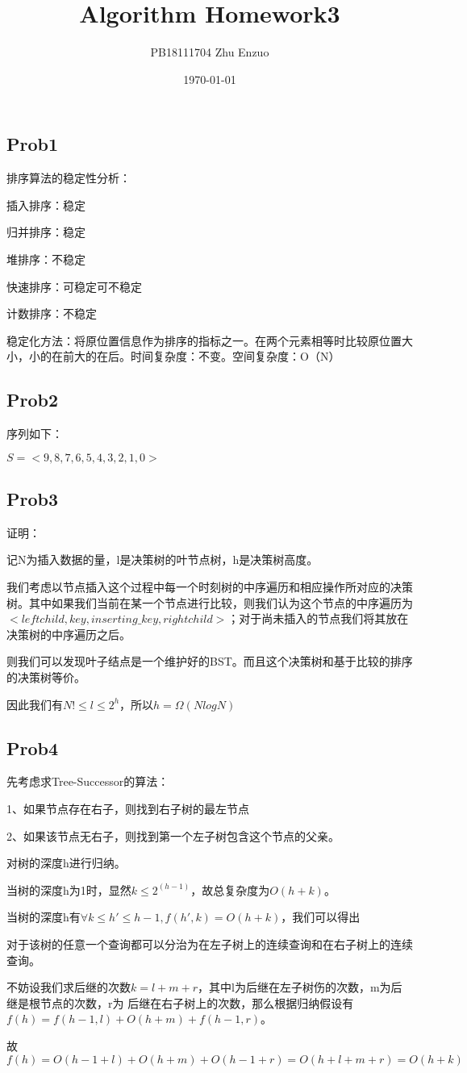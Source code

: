 \documentclass{ctexart}
\title{Algorithm Homework3}
\author{PB18111704 Zhu Enzuo}
\date{\today}
\begin{document}
\maketitle

\subsection{Prob1} 排序算法的稳定性分析：

插入排序：稳定

归并排序：稳定

堆排序：不稳定

快速排序：可稳定可不稳定

计数排序：不稳定

稳定化方法：将原位置信息作为排序的指标之一。在两个元素相等时比较原位置大小，小的在前大的在后。时间复杂度：不变。空间复杂度：O（N）

\subsection{Prob2} 序列如下：

$S=<9,8,7,6,5,4,3,2,1,0>$

\subsection{Prob3} 证明：

记N为插入数据的量，l是决策树的叶节点树，h是决策树高度。

我们考虑以节点插入这个过程中每一个时刻树的中序遍历和相应操作所对应的决策树。其中如果我们当前在某一个节点进行比较，则我们认为这个节点的中序遍历为$<leftchild, key, inserting\_key, rightchild>$；对于尚未插入的节点我们将其放在决策树的中序遍历之后。

则我们可以发现叶子结点是一个维护好的BST。而且这个决策树和基于比较的排序的决策树等价。

因此我们有$N! \le l \le 2^h$，所以$h=\Omega(NlogN)$

\subsection{Prob4}先考虑求Tree-Successor的算法：

1、如果节点存在右子，则找到右子树的最左节点

2、如果该节点无右子，则找到第一个左子树包含这个节点的父亲。

对树的深度h进行归纳。

当树的深度h为1时，显然$k \le 2^(h-1)$，故总复杂度为$O(h+k)$。

当树的深度h有$\forall k\le h'\le h-1, f(h',k)=O(h+k)$，我们可以得出

对于该树的任意一个查询都可以分治为在左子树上的连续查询和在右子树上的连续查询。

不妨设我们求后继的次数$k=l+m+r$，其中l为后继在左子树伤的次数，m为后继是根节点的次数，r为
后继在右子树上的次数，那么根据归纳假设有$f(h)=f(h-1,l)+O(h+m)+f(h-1,r)$。

故$f(h)=O(h-1+l)+O(h+m)+O(h-1+r)=O(h+l+m+r)=O(h+k)$
\end{document}
